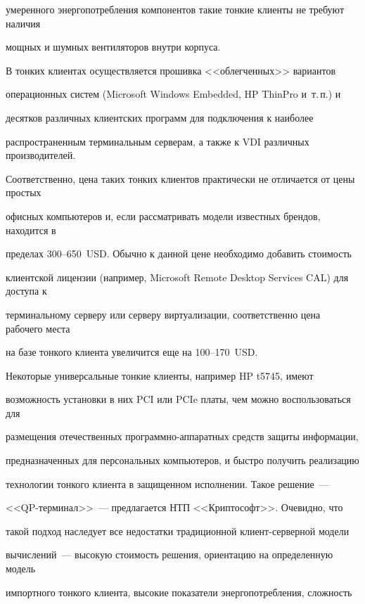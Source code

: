 умеренного энергопотребления компонентов такие тонкие клиенты не требуют наличия 


мощных и шумных вентиляторов внутри корпуса.


       


       В тонких клиентах осуществляется прошивка <<облегченных>> вариантов 


операционных систем (Microsoft Windows Embedded, HP ThinPro и~т.\,п.) и


десятков различных клиентских программ для подключения к наиболее 


распространенным терминальным серверам, а также к VDI различных производителей. 


Соответственно, цена таких тонких клиентов практически не отличается от цены простых 


офисных компьютеров и, если рассматривать модели известных брендов, находится в 


пределах 300--650~USD. Обычно к данной цене необходимо добавить стоимость 


клиентской лицензии (например, Microsoft Remote Desktop Services CAL) для доступа к 


терминальному серверу или серверу виртуализации, соответственно цена рабочего места 


на базе тонкого клиента увеличится еще на 100--170~USD.


       


       Некоторые универсальные тонкие клиенты, например HP t5745, имеют 


возможность установки в них PCI или PCIe платы, чем можно воспользоваться для 


размещения отечественных про\-грам\-мно-ап\-па\-рат\-ных средств защиты информации, 


предназначенных для персональных компьютеров, и быстро получить реализацию 


технологии тонкого клиента в защищенном исполнении. Такое решение~--- 


       <<QP-тер\-ми\-нал>>~--- предлагается НТП <<Криптософт>>. Очевидно, что 


такой подход наследует все недостатки традиционной кли\-ент-сер\-вер\-ной модели 


вычислений~--- высокую стоимость решения, ориентацию на определенную модель 


импортного тонкого клиента, высокие показатели энергопотребления, сложность 


